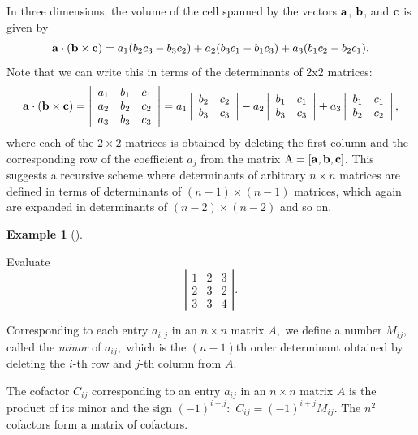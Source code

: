\documentclass[
  a4paper,
  DIV=11,
  numbers=noendperiod,
  oneside]{scrreprt}
\theoremstyle{definition}
\newtheorem{example}{Example}[chapter]
\theoremstyle{remark}
\newenvironment{fbxSimple}[3]{\begin{tcolorbox}[enhanced, breakable,%
attach boxed title to top*={xshift=1.4pt},
boxed title style={boxrule=0.0mm, fuzzy shadow={1pt}{-1pt}{0mm}{0.1mm}{gray}, arc=.3em, rounded corners=east, sharp corners=west}, colframe=#1-color2, colbacktitle=#1-color1, colback = white, coltitle=black,  titlerule=0mm, toprule=0pt, bottomrule=.7pt, leftrule=.3em, rightrule=.7pt, outer arc=.3em,  	left=.5em, right=.5em, bottomtitle=1mm, toptitle=1mm,title=\textbf{#2}\hspace{0.5em}{#3}]}
{\end{tcolorbox}}
\begin{document}
In three dimensions, the volume of the cell spanned by the vectors
\({\bf a}\), \({\bf b}\), and \({\bf c}\) is given by
\[{\bf a}\cdot ( {\bf b} \times {\bf c} )= a_{1}(b_{2}c_{3}- b_{3}c_{2}) + a_{2} (b_{3}c_{1}-b_{1}c_{3}) + a_{3} (b_{1}c_{2}-b_{2}c_{1}).\]
Note that we can write this in terms of the determinants of 2x2
matrices: \[{\bf a}\cdot ({\bf b} \times {\bf c}) = \left| 
\begin{array}{ccc}
a_{1} & b_{1} & c_{1} \\ 
a_{2} & b_{2} & c_{2} \\ 
a_{3} & b_{3} & c_{3}
\end{array}
\right|  = a_{1} \left| 
\begin{array}{cc}
b_{2} & c_{2} \\ 
b_{3} & c_{3}
\end{array}
\right|  - a_{2} \left| 
\begin{array}{cc}
b_{1} & c_{1} \\ 
b_{3} & c_{3}
\end{array}
\right| + a_{3} \left| 
\begin{array}{cc}
b_{1} & c_{1} \\ 
b_{2} & c_{2}
\end{array}
\right| ,\] where each of the \(2 \times 2\) matrices is obtained by
deleting the first column and the corresponding row of the coefficient
\(a_{j}\) from the matrix \({\rm A} = [{\bf a},{\bf b}, {\bf c}]\). This
suggests a recursive scheme where determinants of arbitrary
\(n \times n\) matrices are defined in terms of determinants of
\((n-1)\times(n-1)\) matrices, which again are expanded in determinants
of \((n-2)\times(n-2)\) and so on.

\begin{example}[]\protect\hypertarget{exm-det1}{}\label{exm-det1}

Evaluate \[\left| 
\begin{array}{ccc}
1 & 2 & 3 \\ 
2 & 3 & 2 \\ 
3 & 3 & 4
\end{array}
\right| .\]

\end{example}

\label{minor-and-cofactor}
\begin{fbxSimple}{Definition}{Definition 4.1: }{Minor and Cofactor}
\label{minor-and-cofactor}
Corresponding to each entry \(a_{i,j}\) in an \(n\times n\) matrix
\(A,\) we define a number \(M_{ij},\) called the \emph{minor} of
\(a_{ij},\) which is the \(\left( n-1\right)\)th order determinant
obtained by deleting the \(i\)-th row and \(j\)-th column from \(A.\)

The cofactor \(C_{ij}\) corresponding to an entry \(a_{ij}\) in an
\(n\times n\) matrix \(A\) is the product of its minor and the sign
\(\left( -1\right) ^{i+j}:\) \(C_{ij}=\left( -1\right) ^{i+j}M_{ij}.\)
The \(n^{2}\) cofactors form a matrix of cofactors.

\end{fbxSimple}
\end{document}
